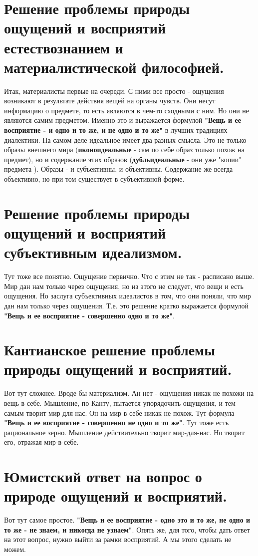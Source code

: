 \section{ Решение проблемы природы ощущений и восприятий естествознанием и материалистической философией.}
Итак, материалисты первые на очереди. С ними все просто - ощущения возникают в результате действия вещей на органы чувств. Они несут информацию о предмете, то есть являются в чем-то сходными с ним. Но они не являются самим предметом. Именно это и выражается формулой \textbf{"Вещь и ее восприятие - и одно и то же, и не одно и то же"} в лучших традициях диалектики. На самом деле идеальное имеет два разных смысла. Это не только образы внешнего мира (\textbf{иконоидеальные} - сам по себе образ только похож на предмет), но и содержание этих образов (\textbf{дубльидеальные} - они уже "копии" предмета ). Образы - и субъективны, и объективны. Содержание же всегда объективно, но при том существует в субъективной форме.

\section{ Решение проблемы природы ощущений и восприятий субъективным идеализмом.}
Тут тоже все понятно. Ощущение первично. Что с этим не так - расписано выше. Мир дан нам только через ощущения, но из этого не следует, что вещи и есть ощущения. Но заслуга субъективных идеалистов в том, что они поняли, что мир дан нам только через ощущения. Т.е. это решение кратко выражается формулой \textbf{"Вещь и ее восприятие - совершенно одно и то же"}.

\section{ Кантианское решение проблемы природы ощущений и восприятий.}
Вот тут сложнее. Вроде бы материализм. Ан нет - ощущения никак не похожи на вещь в себе. Мышление, по Канту, пытается упорядочить ощущения, и тем самым творит мир-для-нас. Он на мир-в-себе никак не похож. Тут формула \textbf{"Вещь и ее восприятие - совершенно не одно и то же"}. Тут тоже есть рациональное зерно. Мышление действительно творит мир-для-нас. Но творит его, отражая мир-в-себе.

\section{ Юмистский ответ на вопрос о природе ощущений и восприятий.}
Вот тут самое простое.  \textbf{"Вещь и ее восприятие - одно это и то же, не одно и то же - не знаем, и никогда не узнаем"}. Опять же, для того, чтобы дать ответ на этот вопрос, нужно выйти за рамки восприятий. А мы этого сделать не можем. 

